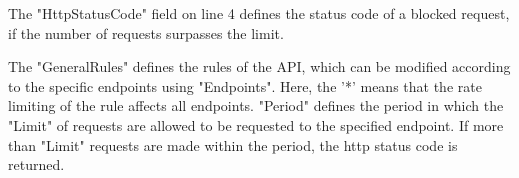 The "HttpStatusCode" field on line 4 defines the status code of a blocked request, if the number of requests surpasses the limit.

The "GeneralRules" defines the rules of the API, which can be modified according to the specific endpoints using "Endpoints". Here, the '*' means that the rate limiting of the rule affects all endpoints. "Period" defines the period in which the "Limit" of requests are allowed to be requested to the specified endpoint. If more than "Limit" requests are made within the period, the http status code is returned.

